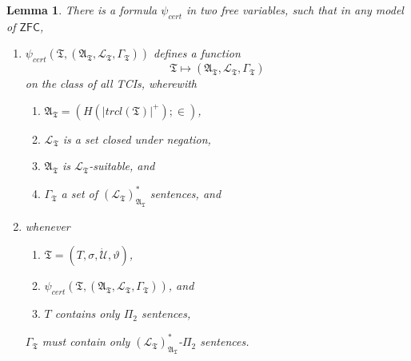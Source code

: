 \documentclass[12pt, twoside]{memoir}
\numberwithin{equation}{section}
\newtheorem{lem}[thm]{Lemma}
\theoremstyle{definition}
\theoremstyle{remark}
\theoremstyle{definition}
\theoremstyle{definition}
\theoremstyle{definition}
\theoremstyle{remark}
\begin{document}
\begin{lem}\label{mcequiv}
There is a formula $\psi_{cert}$ in two free variables, such that in any model of $\mathsf{ZFC}$, 
\begin{enumerate}[label=(\alph*)]
    \item $\psi_{cert}(\mathfrak{T}, (\mathfrak{A}_{\mathfrak{T}}, \mathcal{L}_{\mathfrak{T}}, \Gamma_{\mathfrak{T}}))$ defines a function $$\mathfrak{T} \mapsto (\mathfrak{A}_{\mathfrak{T}}, \mathcal{L}_{\mathfrak{T}}, \Gamma_{\mathfrak{T}})$$ on the class of all TCIs, wherewith
    \begin{enumerate}[label=(\roman*)]
        \item $\mathfrak{A}_{\mathfrak{T}} = (H(|trcl(\mathfrak{T})|^+); \in)$,
        \item $\mathcal{L}_{\mathfrak{T}}$ is a set closed under negation, 
        \item $\mathfrak{A}_{\mathfrak{T}}$ is $\mathcal{L}_{\mathfrak{T}}$-suitable, and
        \item $\Gamma_{\mathfrak{T}}$ a set of $({\mathcal{L}_{\mathfrak{T}}})^*_{\mathfrak{A}_{\mathfrak{T}}}$ sentences, and
    \end{enumerate}
    \item whenever
    \begin{enumerate}[label=(\roman*)]
        \item $\mathfrak{T} = (T, \sigma, \dot{\mathcal{U}}, \vartheta)$, 
        \item $\psi_{cert}(\mathfrak{T}, (\mathfrak{A}_{\mathfrak{T}}, \mathcal{L}_{\mathfrak{T}}, \Gamma_{\mathfrak{T}}))$, and
        \item $T$ contains only $\Pi_2$ sentences, 
    \end{enumerate} 
    $\Gamma_{\mathfrak{T}}$ must contain only $({\mathcal{L}_{\mathfrak{T}}})^{*}_{\mathfrak{A}_{\mathfrak{T}}}$-$\Pi_2$ sentences.
\end{enumerate}
\end{lem}
\end{document}
